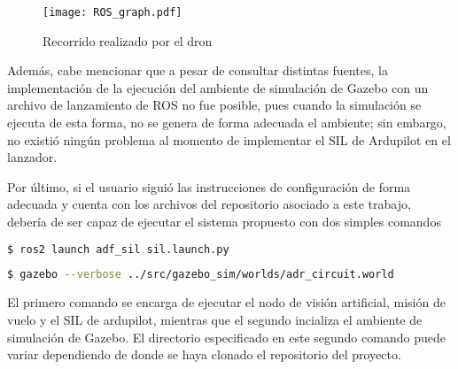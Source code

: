 \begin{figure}[ht]
    \centering
    \texttt{[image: ROS\_graph.pdf]}
    \caption{Recorrido realizado por el dron}
    \label{fig:ROS_graph}
\end{figure}


Además, cabe mencionar que a pesar de consultar distintas fuentes, la implementación de la ejecución del ambiente de simulación de Gazebo con un archivo de lanzamiento de ROS no fue posible, pues cuando la simulación se ejecuta de esta forma, no se genera de forma adecuada el ambiente; sin embargo, no existió ningún problema al momento de implementar el SIL de Ardupilot en el lanzador.

Por último, si el usuario siguió las instrucciones de configuración de forma adecuada y cuenta con los archivos del repositorio asociado a este trabajo, debería de ser capaz de ejecutar el sistema propuesto con dos simples comandos

\begin{lstlisting}[language = bash]
    $ ros2 launch adf_sil sil.launch.py
\end{lstlisting}

\begin{lstlisting}[language = bash]
    $ gazebo --verbose ../src/gazebo_sim/worlds/adr_circuit.world
\end{lstlisting}


El primero comando se encarga de ejecutar el nodo de visión artificial, misión de vuelo y el SIL de ardupilot, mientras que el segundo incializa el ambiente de simulación de Gazebo. El directorio especificado en este segundo comando puede variar dependiendo de donde se haya clonado el repositorio del proyecto.


